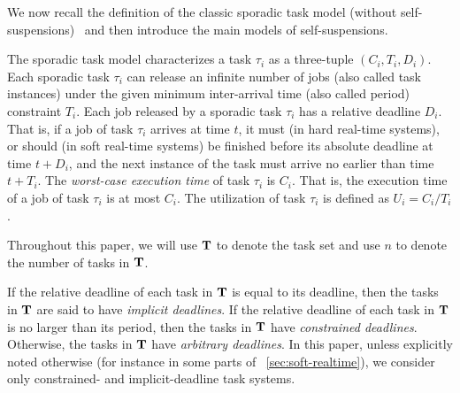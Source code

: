 


\label{sec:model}

We now recall the definition of the classic sporadic task model (without self-suspensions)~\cite{Liu_1973,Mok:1983:FDP:888951} and then introduce the main models of self-suspensions. 

The sporadic task model characterizes a task $\tau_i$ as a three-tuple $(C_i,T_i,D_i)$. Each sporadic task $\tau_i$ can release an infinite number of jobs (also called task instances) under the given minimum inter-arrival time (also called period) constraint $T_i$.  Each job released by a sporadic task $\tau_i$ has a relative deadline $D_i$.  That is, if a job of task $\tau_i$ arrives at time $t$, it must (in hard real-time systems), or should (in soft real-time systems) be finished before its absolute deadline at time $t+D_i$, and the next instance of the task must arrive no earlier than time $t + T_i$.
The \emph{worst-case execution time} of task $\tau_i$ is $C_i$. That is, the execution time of a job of task $\tau_i$ is at most $C_i$. The utilization of task $\tau_i$ is defined as $U_i=C_i/T_i$.

Throughout this paper, we will use ${\bf T}$ to denote the %
task
set and use $n$ to denote the number of tasks in ${\bf T}$. 

If the relative deadline of each task in ${\bf T}$ is equal to its deadline, then the tasks in ${\bf T}$ are said to have
\emph{implicit deadlines}. If the relative deadline of
each task in ${\bf T}$ is no larger than its period, then the  tasks in ${\bf T}$ have \emph{constrained deadlines}. Otherwise, the tasks in ${\bf T}$ have \emph{arbitrary deadlines}.
In this paper, unless explicitly noted otherwise (for instance in some parts of
\mysectionref{}~\ref{sec:soft-realtime}),
we consider only constrained- and
implicit-deadline task systems.

